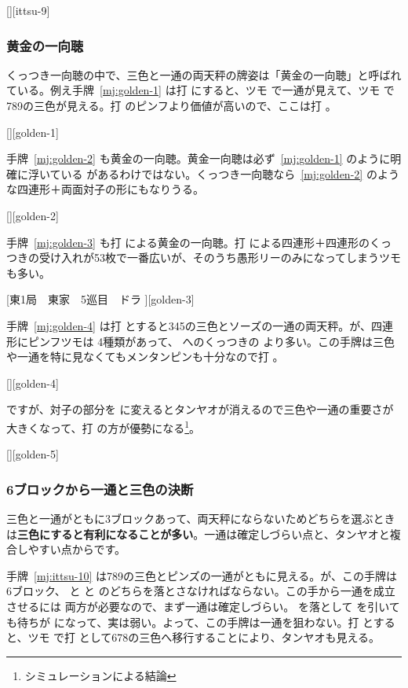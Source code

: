 \documentclass[../nankiru_main.tex]{subfiles}
\begin{document}
[][ittsu-9]


\subsubsection*{黄金の一向聴}

くっつき一向聴の中で、三色と一通の両天秤の牌姿は「黄金の一向聴」と呼ばれている。例え手牌~\ref{mj:golden-1} は打  にすると、ツモ  で一通が見えて、ツモ  で789の三色が見える。打  のピンフより価値が高いので、ここは打  \citep{rb1}。

[][golden-1]

手牌~\ref{mj:golden-2} も黄金の一向聴。黄金一向聴は必ず~\ref{mj:golden-1} のように明確に浮いている  があるわけではない。くっつき一向聴なら~\ref{mj:golden-2} のような四連形＋両面対子の形にもなりうる。

[][golden-2]

手牌~\ref{mj:golden-3} も打  による黄金の一向聴。打  による四連形＋四連形のくっつきの受け入れが53枚で一番広いが、そのうち愚形リーのみになってしまうツモも多い\citep{shibukawa-ssk}。

[東1局　東家　5巡目　ドラ ][golden-3]

手牌~\ref{mj:golden-4} は打  とすると345の三色とソーズの一通の両天秤。が、四連形にピンフツモは  4種類があって、 へのくっつきの  より多い。この手牌は三色や一通を特に見なくてもメンタンピンも十分なので打  \citep{gendai-ittsu}。

[][golden-4]

ですが、対子の部分を  に変えるとタンヤオが消えるので三色や一通の重要さが大きくなって、打  の方が優勢になる\footnote{シミュレーションによる結論}。

[][golden-5]


\subsubsection*{6ブロックから一通と三色の決断}

三色と一通がともに3ブロックあって、両天秤にならないためどちらを選ぶときは\textbf{三色にすると有利になることが多い}\citep{gendai-ittsu}。一通は確定しづらい点と、タンヤオと複合しやすい点からです。

手牌~\ref{mj:ittsu-10} は789の三色とピンズの一通がともに見える。が、この手牌は6ブロック、 と  と  のどちらを落とさなければならない。この手から一通を成立させるには  両方が必要なので、まず一通は確定しづらい。 を落として  を引いても待ちが  になって、実は弱い。よって、この手牌は一通を狙わない。打  とすると、ツモ  で打  として678の三色へ移行することにより、タンヤオも見える。
\end{document}
